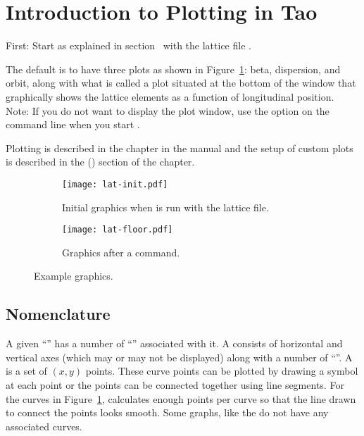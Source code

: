 \documentclass{hitec}     %
\newcommand{\Section}[1]{\section{#1}\vspace*{-1ex}}
\begin{document}
\Section{Introduction to Plotting in Tao}
\label{s:plotting}

First: Start \tao as explained in section~ with the lattice file
.

The default is to have three plots as shown in Figure~\ref{f:lat.init}: beta, dispersion, and orbit,
along with what is called a  plot situated at the bottom of the window that
graphically shows the lattice elements as a function of longitudinal position. Note: If you do not
want \tao to display the plot window, use the  option on the command line when you start
\tao.

Plotting is described in the  chapter in the \tao manual and the setup of custom plots
is described in the  () section of the  chapter.

\begin{figure}[hb]
  \centering
  \begin{subfigure}[t]{0.47\textwidth}
    \texttt{[image: lat-init.pdf]}
    \caption{Initial graphics when \tao is run with the  lattice file.}
    \label{f:lat.init}
  \end{subfigure}
  \hfil
  \begin{subfigure}[t]{0.47\textwidth}
    \texttt{[image: lat-floor.pdf]}
    \caption{Graphics after a  command.}
    \label{f:lat.floor}
  \end{subfigure}
  \caption{Example \tao graphics.}
\end{figure}

\vfill
\newpage

\subsection{Nomenclature}


A given ``'' has a number of ``'' associated with it. A  consists of
horizontal and vertical axes (which may or may not be displayed) along with a number of
``''.  A  is a set of $(x, y)$ points. These curve points can be plotted by drawing
a symbol at each point or the points can be connected together using line segments. For the curves in
Figure~\ref{f:lat.init}, \tao calculates enough points per curve so that the line drawn to connect
the points looks smooth. Some graphs, like the  do not have any associated curves.
\end{document}
